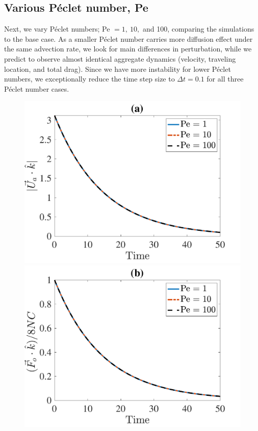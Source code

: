 \subsection{Various Péclet number, Pe}
Next, we vary Péclet numbers; Pe $=1, \ 10, $ and 100, comparing the simulations to the base case.  As a smaller Péclet number carries more diffusion effect under the same advection rate, we look for main differences in perturbation, while we predict to observe almost identical aggregate dynamics (velocity, traveling location, and total drag). 
Since we have more instability for lower Péclet numbers, we exceptionally reduce the time step size to $\Delta t = 0.1$ for all three Péclet number cases.
\begin{figure}[ht]
	\begin{center}
		\includegraphics[scale=0.35]{./figures/fig_NC50_Pe_Ua3_all}
		\includegraphics[scale=0.35]{./figures/fig_NC50_Pe_Fo3_all}

\end{center}
\end{figure}
